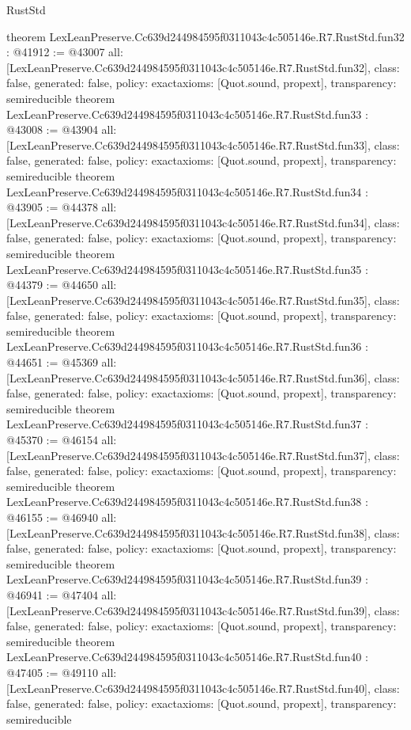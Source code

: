 \begin{lexlean}{RustStd}
\begin{coremodule}
{}
theorem LexLeanPreserve.Cc639d244984595f0311043c4c505146e.R7.RustStd.fun32 : @41912 := @43007 {
  all: [LexLeanPreserve.Cc639d244984595f0311043c4c505146e.R7.RustStd.fun32],
  class: false,
  generated: false,
  policy: exact{axioms: [Quot.sound, propext]},
  transparency: semireducible
}
theorem LexLeanPreserve.Cc639d244984595f0311043c4c505146e.R7.RustStd.fun33 : @43008 := @43904 {
  all: [LexLeanPreserve.Cc639d244984595f0311043c4c505146e.R7.RustStd.fun33],
  class: false,
  generated: false,
  policy: exact{axioms: [Quot.sound, propext]},
  transparency: semireducible
}
theorem LexLeanPreserve.Cc639d244984595f0311043c4c505146e.R7.RustStd.fun34 : @43905 := @44378 {
  all: [LexLeanPreserve.Cc639d244984595f0311043c4c505146e.R7.RustStd.fun34],
  class: false,
  generated: false,
  policy: exact{axioms: [Quot.sound, propext]},
  transparency: semireducible
}
theorem LexLeanPreserve.Cc639d244984595f0311043c4c505146e.R7.RustStd.fun35 : @44379 := @44650 {
  all: [LexLeanPreserve.Cc639d244984595f0311043c4c505146e.R7.RustStd.fun35],
  class: false,
  generated: false,
  policy: exact{axioms: [Quot.sound, propext]},
  transparency: semireducible
}
theorem LexLeanPreserve.Cc639d244984595f0311043c4c505146e.R7.RustStd.fun36 : @44651 := @45369 {
  all: [LexLeanPreserve.Cc639d244984595f0311043c4c505146e.R7.RustStd.fun36],
  class: false,
  generated: false,
  policy: exact{axioms: [Quot.sound, propext]},
  transparency: semireducible
}
theorem LexLeanPreserve.Cc639d244984595f0311043c4c505146e.R7.RustStd.fun37 : @45370 := @46154 {
  all: [LexLeanPreserve.Cc639d244984595f0311043c4c505146e.R7.RustStd.fun37],
  class: false,
  generated: false,
  policy: exact{axioms: [Quot.sound, propext]},
  transparency: semireducible
}
theorem LexLeanPreserve.Cc639d244984595f0311043c4c505146e.R7.RustStd.fun38 : @46155 := @46940 {
  all: [LexLeanPreserve.Cc639d244984595f0311043c4c505146e.R7.RustStd.fun38],
  class: false,
  generated: false,
  policy: exact{axioms: [Quot.sound, propext]},
  transparency: semireducible
}
theorem LexLeanPreserve.Cc639d244984595f0311043c4c505146e.R7.RustStd.fun39 : @46941 := @47404 {
  all: [LexLeanPreserve.Cc639d244984595f0311043c4c505146e.R7.RustStd.fun39],
  class: false,
  generated: false,
  policy: exact{axioms: [Quot.sound, propext]},
  transparency: semireducible
}
theorem LexLeanPreserve.Cc639d244984595f0311043c4c505146e.R7.RustStd.fun40 : @47405 := @49110 {
  all: [LexLeanPreserve.Cc639d244984595f0311043c4c505146e.R7.RustStd.fun40],
  class: false,
  generated: false,
  policy: exact{axioms: [Quot.sound, propext]},
  transparency: semireducible
}
\end{coremodule}
\end{lexlean}
